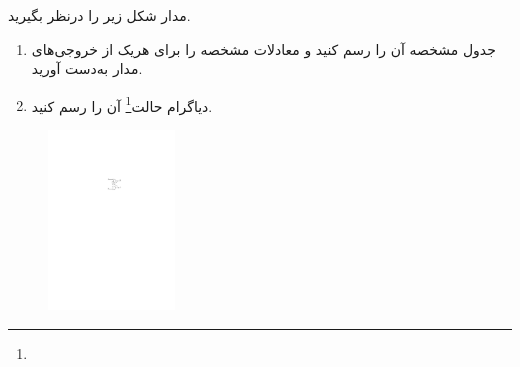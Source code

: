 

مدار شکل زیر را درنظر بگیرید.

\begin{enumerate}
	\item 
	جدول مشخصه آن را رسم کنید و معادلات مشخصه را برای هریک از خروجی‌های مدار به‌دست آورید.
	
	\item 
	دیاگرام حالت\footnote{} آن را رسم کنید.

\end{enumerate}


\begin{figure}[h]
	\centering
	\includegraphics[width=0.3\textwidth]{fig/Q_basic1.pdf}
	\label{fig:Q_basic_1}
\end{figure}